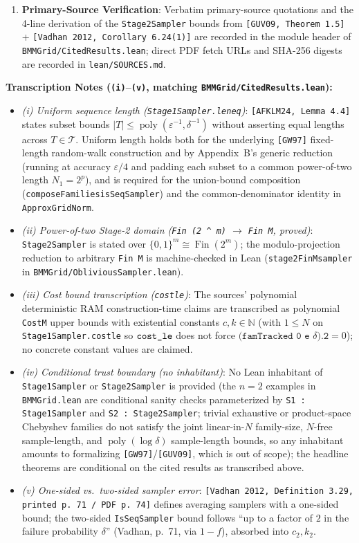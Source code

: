\documentclass[10pt,letterpaper]{article}
\renewcommand{\_}{\origunderscore\allowbreak}
\newcommand{\code}[1]{\texttt{#1}}
\begin{document}
\begin{enumerate}
  \item \textbf{Primary-Source Verification}: Verbatim primary-source quotations and the 4-line derivation of the \code{Stage2Sampler} bounds from \code{[GUV09, Theorem 1.5]} + \code{[Vadhan 2012, Corollary 6.24(1)]} are recorded in the module header of \code{BMMGrid/CitedResults.lean}; direct PDF fetch URLs and SHA-256 digests are recorded in \code{lean/SOURCES.md}.
\end{enumerate}

\textbf{Transcription Notes (\code{(i)}--\code{(v)}, matching \code{BMMGrid/CitedResults.lean}):}
\begin{itemize}
  \item \emph{(i) Uniform sequence length (\code{Stage1Sampler.len\_eq})}: \code{[AFKLM24, Lemma 4.4]} states subset bounds $|T| \le \operatorname{poly}(\varepsilon^{-1}, \delta^{-1})$ without asserting equal lengths across $T \in \mathcal{T}$. Uniform length holds both for the underlying \code{[GW97]} fixed-length random-walk construction and by Appendix~B's generic reduction (running at accuracy $\varepsilon/4$ and padding each subset to a common power-of-two length $N_1 = 2^p$), and is required for the union-bound composition (\code{composeFamilies\_isSeqSampler}) and the common-denominator identity in \code{ApproxGridNorm}.
  \item \emph{(ii) Power-of-two Stage-2 domain (\code{Fin (2 \^{} m)} $\to$ \code{Fin M}, proved)}: \code{Stage2Sampler} is stated over $\{0,1\}^m \cong \operatorname{Fin}(2^m)$; the modulo-projection reduction to arbitrary \code{Fin M} is machine-checked in Lean (\code{stage2FinM\_sampler} in \code{BMMGrid/ObliviousSampler.lean}).
  \item \emph{(iii) Cost bound transcription (\code{cost\_le})}: The sources' polynomial deterministic RAM construction-time claims are transcribed as polynomial \code{CostM} upper bounds with existential constants $c, k \in \mathbb{N}$ (with $1 \le N$ on \code{Stage1Sampler.cost\_le} so $\code{cost\_le}$ does not force $\code{(famTracked 0 e }\delta\code{).2} = 0$); no concrete constant values are claimed.
  \item \emph{(iv) Conditional trust boundary (no inhabitant)}: No Lean inhabitant of \code{Stage1Sampler} or \code{Stage2Sampler} is provided (the $n = 2$ examples in \code{BMMGrid.lean} are conditional sanity checks parameterized by \code{S1 : Stage1Sampler} and \code{S2 : Stage2Sampler}; trivial exhaustive or product-space Chebyshev families do not satisfy the joint linear-in-$N$ family-size, $N$-free sample-length, and $\operatorname{poly}(\log \delta)$ sample-length bounds, so any inhabitant amounts to formalizing \code{[GW97]}/\code{[GUV09]}, which is out of scope); the headline theorems are conditional on the cited results as transcribed above.
  \item \emph{(v) One-sided vs.\ two-sided sampler error}: \code{[Vadhan 2012, Definition 3.29, printed p.~71 / PDF p.~74]} defines averaging samplers with a one-sided bound; the two-sided \code{IsSeqSampler} bound follows ``up to a factor of $2$ in the failure probability $\delta$'' (Vadhan, p.~71, via $1 - f$), absorbed into $c_2, k_2$.
\end{itemize}
\end{document}
